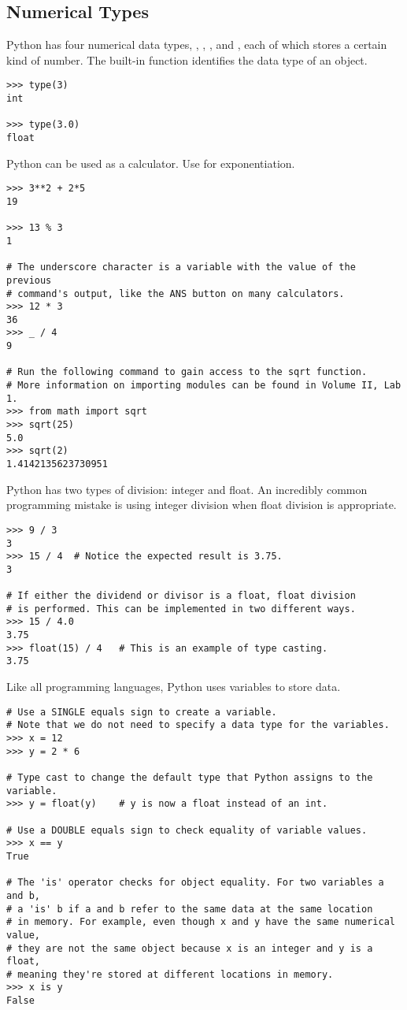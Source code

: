 \subsection*{Numerical Types}
Python has four numerical data types, , , 
, and , each of which stores a certain kind of number.
The built-in function  identifies the data type of an object.

\begin{lstlisting}
>>> type(3)
int

>>> type(3.0)
float
\end{lstlisting}

Python can be used as a calculator. Use \li{**} for exponentiation.
\begin{lstlisting}
>>> 3**2 + 2*5
19

>>> 13 % 3
1

# The underscore character is a variable with the value of the previous
# command's output, like the ANS button on many calculators.
>>> 12 * 3
36
>>> _ / 4
9

# Run the following command to gain access to the sqrt function.
# More information on importing modules can be found in Volume II, Lab 1.
>>> from math import sqrt
>>> sqrt(25)
5.0
>>> sqrt(2)
1.4142135623730951
\end{lstlisting}

Python has two types of division: integer and float.
An incredibly common programming mistake is using integer division when float division is appropriate. %
\begin{lstlisting}
>>> 9 / 3
3
>>> 15 / 4	# Notice the expected result is 3.75.
3

# If either the dividend or divisor is a float, float division
# is performed. This can be implemented in two different ways.
>>> 15 / 4.0
3.75
>>> float(15) / 4	# This is an example of type casting.
3.75
\end{lstlisting}

Like all programming languages, Python uses variables to store data.

\begin{lstlisting}
# Use a SINGLE equals sign to create a variable.
# Note that we do not need to specify a data type for the variables.
>>> x = 12
>>> y = 2 * 6

# Type cast to change the default type that Python assigns to the variable.
>>> y = float(y)	# y is now a float instead of an int.

# Use a DOUBLE equals sign to check equality of variable values.
>>> x == y  
True

# The 'is' operator checks for object equality. For two variables a and b,
# a 'is' b if a and b refer to the same data at the same location
# in memory. For example, even though x and y have the same numerical value,
# they are not the same object because x is an integer and y is a float,
# meaning they're stored at different locations in memory.
>>> x is y
False                   
\end{lstlisting}

